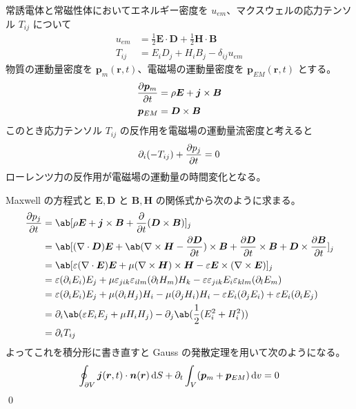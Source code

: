 \documentclass[uplatex,dvipdfmx,a4paper,11pt]{jlreq}
\makeatletter
\newcommand{\EE}{\bm{E}}
\newcommand{\BB}{\bm{B}}
\newcommand{\DD}{\bm{D}}
\newcommand{\HH}{\bm{H}}
\newcommand{\rr}{\bm{r}}
\newcommand{\pp}{\bm{p}}
\newcommand{\vnabla}{\mathbf{\nabla}}
\numberwithin{equation}{section}
\theoremstyle{definition}
\renewenvironment{proof}[1][\proofname]{\par
  \normalfont
  \topsep6\p@\@plus6\p@ \trivlist
  \item[\hskip\labelsep{\bfseries #1}\@addpunct{\bfseries}]\ignorespaces\quad\par
}{%
  \qed\endtrivlist\@endpefalse
}
\renewcommand\proofname{証明}
\makeatother
\begin{document}
\begin{theorem}[運動量保存則]
  常誘電体と常磁性体においてエネルギー密度を $u_{em}$、マクスウェルの応力テンソル $T_{ij}$ について
  \begin{align}
    u_{em} & = \frac{1}{2}\EE\cdot\DD + \frac{1}{2}\HH\cdot\BB \\
    T_{ij} & = E_iD_j + H_iB_j - \delta_{ij}u_{em}
  \end{align}
  物質の運動量密度を $\pp_m(\rr, t)$、電磁場の運動量密度を $\pp_{EM}(\rr, t)$ とする。
  \begin{align}
    \diffp{\pp_m}{t} & = \rho\EE + \bm{j}\times\BB \\
    \pp_{EM}         & = \DD\times\BB
  \end{align}
  このとき応力テンソル $T_{ij}$ の反作用を電磁場の運動量流密度と考えると
  \begin{align}
    \partial_i(-T_{ij}) + \diffp{p_j}{t} = 0
  \end{align}
  ローレンツ力の反作用が電磁場の運動量の時間変化となる。
\end{theorem}
\begin{proof}
  Maxwell の方程式と $\EE, \DD$ と $\BB, \HH$ の関係式から次のように求まる。
  \begin{align}
    \diffp{p_j}{t} & = \ab[\rho\EE + \bm{j}\times\BB + \diffp{}{t}(\DD\times\BB)]_j                                                                                              \\
                   & = \ab[(\vnabla\cdot\DD)\EE + \ab(\vnabla\times\HH - \diffp{\DD}{t})\times\BB + \diffp{\DD}{t}\times\BB + \DD\times\diffp{\BB}{t}]_j                         \\
                   & = \ab[\varepsilon(\vnabla\cdot\EE)\EE + \mu(\vnabla\times\HH)\times\HH - \varepsilon\EE\times(\vnabla\times\EE)]_j                                          \\
                   & = \varepsilon(\partial_iE_i)E_j + \mu\varepsilon_{jik}\varepsilon_{ilm}(\partial_lH_m)H_k - \varepsilon\varepsilon_{jik}E_i\varepsilon_{klm}(\partial_lE_m) \\
                   & = \varepsilon(\partial_iE_i)E_j + \mu(\partial_iH_j)H_i - \mu(\partial_jH_i)H_i - \varepsilon E_i(\partial_jE_i) + \varepsilon E_i(\partial_iE_j)           \\
                   & = \partial_i\ab(\varepsilon E_iE_j + \mu H_iH_j) - \partial_j\ab(\frac{1}{2}(E_i^2 + H_i^2))                                                                \\
                   & = \partial_iT_{ij}
  \end{align}
  よってこれを積分形に書き直すと Gauss の発散定理を用いて次のようになる。
  \begin{align}
    \oint_{\partial V}\bm{j}(\rr, t)\cdot\bm{n}(\rr)\dl{S} + \partial_t\int_V(\pp_m + \pp_{EM})\dl{v} = 0
  \end{align}
\end{proof}
\end{document}
